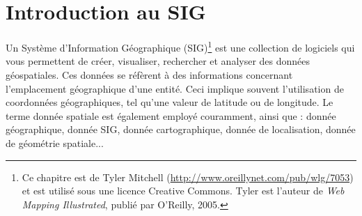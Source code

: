 \section{Introduction au SIG}\label{label_intro} 


Un Système d'Information Géographique (SIG)\cite{mitchel05}\footnote{Ce chapitre est de Tyler Mitchell (\url{http://www.oreillynet.com/pub/wlg/7053}) et est utilisé sous une licence Creative Commons. Tyler est l'auteur de \textit{Web Mapping Illustrated}, publié par O'Reilly, 2005.} est une collection de logiciels qui vous permettent de créer, visualiser, rechercher et analyser des données géospatiales. Ces données se réfèrent à des informations concernant l'emplacement géographique d'une entité. Ceci implique souvent l'utilisation de coordonnées géographiques, tel qu'une valeur de latitude ou de longitude. Le terme donnée spatiale est également employé couramment, ainsi que : donnée géographique, donnée SIG, donnée cartographique, donnée de localisation, donnée de géométrie spatiale...


